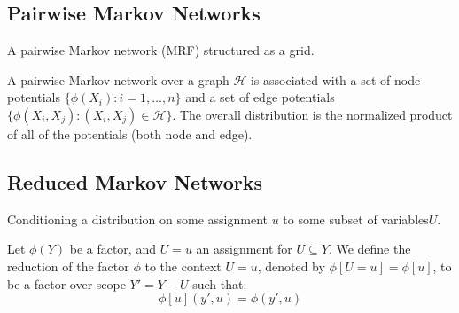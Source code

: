 \subsection{Pairwise Markov Networks}

\begin{marginfigure}
\markovPairwise
\caption{A pairwise Markov network (MRF) structured as a grid.}
\end{marginfigure}

A pairwise Markov network over a graph $\mathcal{H}$ is associated with a set of node potentials $\{\phi(X_i): i=1,\ldots,n\}$ and a set of edge potentials $\{\phi(X_i, X_j): (X_i, X_j) \in \mathcal{H}\}$. The overall distribution is the normalized product of all of the potentials (both node and edge).


\subsection{Reduced Markov Networks}
Conditioning a distribution on some assignment $u$ to some subset of variables$U$.

Let $\phi(Y)$ be a factor, and $U = u$ an assignment for $U \subseteq Y$.  We define the reduction of the factor $\phi$ to the context $U=u$, denoted by $\phi[U=u] = \phi[u]$, to be a factor over scope $Y' = Y - U$ such that:
\[ \phi[u](y', u) = \phi(y', u)\]






















